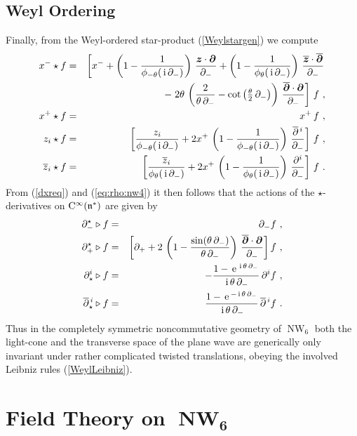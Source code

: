\documentclass[11pt,a4paper]{article}
\DeclareMathOperator{\NW}{NW}
\newcommand{\1}{\mathbb{1}}
\newcommand{\mbf}[1]{{\boldsymbol {#1} }}
\def\ii{{\,{\rm i}\,}}
\def\CC{{\rm C}}
\def\mz{{\mbf z}}
\def\mdell{{\mbf\partial}}
\def\mfn{{\mathfrak n}}
\def\e{{\,\rm e}\,}
\def\bea{\begin{eqnarray}}
\def\eea{\end{eqnarray}}
\begin{document}
\subsection{Weyl Ordering \label{Weylderiv}}

Finally, from the Weyl-ordered star-product (\ref{Weylstargen}) we
compute
\bea
x^-\star f&=&\left[x^-+\left(1-\frac1{\phi_{-\theta}(\ii\partial_-)}
\right)\,\frac{\mz\cdot\mdell}{\partial_-}+
\left(1-\frac1{\phi_{\theta}(\ii\partial_-)}
\right)\,\frac{\overline{\mz}\cdot\overline{\mdell}}{\partial_-}
\right.\nonumber\\ &&\qquad-\left.2\theta\,\left(\frac{2}
{\theta\,\partial_-}-\cot\left(\mbox{$\frac\theta2\,\partial_-$}
\right)\right)\,\frac{\overline{\mdell}
\cdot\mdell}{\partial_-}\right]\,f \ , \nonumber\\
x^+\star f&=&x^+\,f \ , \nonumber\\
z_i\star f&=&\left[\frac{z_i}{\phi_{-\theta}(\ii\partial_-)}+
2x^+\,\left(1-\frac1{\phi_{-\theta}(\ii\partial_-)}\right)\,
\frac{\overline{\partial}{}^{\,i}}{\partial_-}\right]\,f \ ,
\nonumber\\ \overline{z}_i\star f&=&
\left[\frac{\overline{z}_i}{\phi_{\theta}(\ii\partial_-)}+
2x^+\,\left(1-\frac1{\phi_{\theta}(\ii\partial_-)}\right)\,
\frac{\partial^i}{\partial_-}\right]\,f \ .
\label{Weylxfprods}\eea
From (\ref{dxreq}) and (\ref{eq:rho:nw4}) it then follows that the
actions of the $\star$-derivatives on $\CC^\infty(\mfn^*)$ are given
by
\bea
\partial_-^\star\triangleright f&=&\partial_-f \ , \nonumber\\
\partial_+^\star\triangleright f&=&\left[\partial_++2\,
\left(1-\frac{\sin(\theta\,\partial_-)}{\theta\,\partial_-}
\right)\,\frac{\overline{\mdell}\cdot\mdell}{\partial_-}
\right]f \ , \nonumber\\ \partial_\star^i\triangleright f&=&
-\frac{1-\e^{\ii\theta\,\partial_-}}{\ii\theta\,\partial_-}\,
\partial^if \ , \nonumber\\ \overline{\partial}{}_\star^{\,i}
\triangleright f&=&\frac{1-\e^{-\ii\theta\,\partial_-}}
{\ii\theta\,\partial_-}\,\overline{\partial}{}^{\,i}f \ .
\label{Weylderivs}\eea
Thus in the completely symmetric noncommutative geometry of $\NW_6$ both the
light-cone and the transverse space of the plane wave are generically
only invariant under rather complicated twisted translations, obeying
the involved Leibniz rules (\ref{WeylLeibniz}).


\section{Field Theory on $\mbf{\NW_6}$\label{FieldTheory}}
\end{document}

